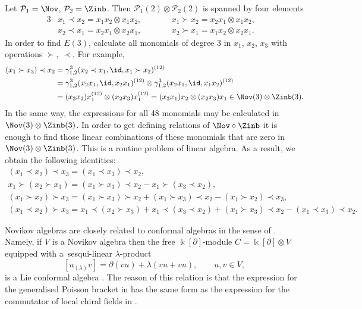 \begin{Example}\label{exmp:Nov-Zinb}
Let $\mathcal P_1=\Nov$, $\mathcal P_2=\Zinb$.
Then $\mathcal P_1(2)\otimes \mathcal P_2(2)$ is spanned by four elements
\begin{alignat*}{3}
& x_1\prec x_2 = x_1x_2\otimes x_1x_2,
 \qquad &&
 x_1\succ x_2 = x_2x_1\otimes x_1x_2, &
 \\
& x_2\prec x_1 = x_2x_1\otimes x_2x_1,
 \qquad &&
 x_2\succ x_1 = x_1x_2\otimes x_2x_1. &
\end{alignat*}
In order to find $E(3)$, calculate all monomials of degree 3 in $x_1$, $x_2$, $x_3$
with operations $\succ$, $\prec$. For example,
%
\begin{align*}
 (x_1\succ x_3)\prec x_2 &= \gamma^3_{1,2} (x_2\prec x_1, \id, x_1\succ x_2)^{(12)}
 \\
 &=
 \gamma^3_{1,2}(x_2x_1, \id, x_2x_1)^{(12)}\otimes \gamma^3_{1,2}(x_2x_1, \id, x_1x_2)^{(12)}
 \\
& =
(x_3x_2)x_1^{(12)}\otimes (x_2x_3)x_1^{(12)}
=
(x_3x_1)x_2\otimes (x_2x_3)x_1 \in \Nov(3)\otimes \Zinb(3).
\end{align*}
%
In the same way, the expressions for all 48 monomials may be calculated
in $\Nov(3)\otimes \Zinb(3)$. In order to get defining relations
of $\Nov\circ \Zinb$ it is enough to find those linear combinations
of these monomials that are zero in $\Nov(3)\otimes \Zinb(3)$.
This is a routine problem of linear algebra.
As a result, we obtain the following identities:
%
\begin{gather}
(x_1\prec x_2)\prec x_3=(x_1\prec x_3)\prec x_2,\nonumber\\
x_1\succ (x_2\succ x_3) = (x_1\succ x_3)\prec x_2-x_1\succ (x_3\prec x_2),\nonumber\\
(x_1\succ x_2)\succ x_3=(x_1\succ x_3)\succ x_2 +(x_1\succ x_3)\prec x_2-(x_1\succ x_2)\prec x_3, \label{eq:pre-Novikov}\\
%
(x_1\prec x_2)\succ x_3=x_1\prec (x_2\succ x_3)+x_1\prec (x_3\prec x_2)
 +(x_1\succ x_3)\prec x_2-(x_1\prec x_3)\prec x_2.\nonumber
\end{gather}
\end{Example}

\begin{Remark}%
Novikov algebras are closely
related to conformal algebras in the sense
of \cite{Kac:VAforbeginners}.
Namely, if $V$ is a Novikov algebra then
the free $\Bbbk [\partial ]$-module $C=\Bbbk[\partial ]\otimes V$
equipped with a~sesqui-linear $\lambda $-product
\[
[u{}_{(\lambda )} v] = \partial (vu) + \lambda (vu + vu),
\qquad u,v\in V,
\]
is a Lie conformal algebra \cite{Xu1999}. The reason of this
relation is that the expression for the generalised Poisson
bracket in \cite{BN1985} has the same form as the expression
for the commutator of local chiral fields in \cite{Kac:VAforbeginners}.
\end{Remark}

